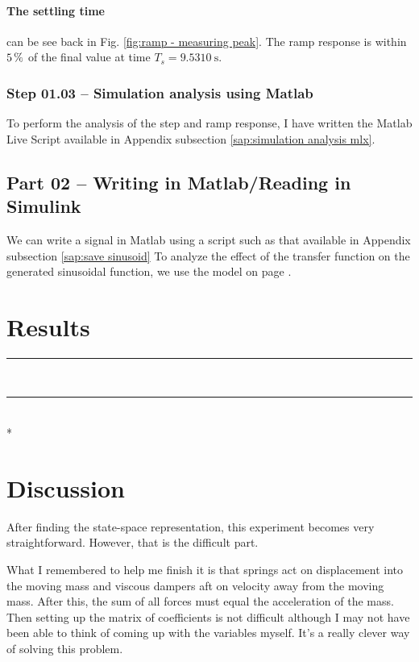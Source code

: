\documentclass[12pt]{article}
\def\hr{{\par\noindent\rule{\textwidth}{0.4pt}}}
\begin{document}
\paragraph{The settling time} can be see back in Fig. \ref{fig:ramp - measuring peak}.
The ramp response is within $\SI5\percent$ of the final value at time $T_s = \SI{9.5310}\second$.

\subsubsection{Step 01.03 -- Simulation analysis using Matlab}

To perform the analysis of the step and ramp response,
I have written the Matlab Live Script available in Appendix subsection \ref{sap:simulation analysis mlx}.

\subsection{Part 02 -- Writing in Matlab/Reading in Simulink}

We can write a signal in Matlab using a script such as that available in Appendix subsection \ref{sap:save sinusoid}
To analyze the effect of the transfer function on the generated sinusoidal function,
we use the model on page \pageref{pdf:part02}.



\section{Results}

\hr



\ \hr \\*



\section{Discussion}

After finding the state-space representation,
this experiment becomes very straightforward.
However, that is the difficult part.

What I remembered to help me finish it is that springs act on displacement into the moving mass and viscous dampers aft on velocity away from the moving mass.
After this, the sum of all forces must equal the acceleration of the mass.
Then setting up the matrix of coefficients is not difficult although I may not have been able to think of coming up with the variables myself.
It's a really clever way of solving this problem.
\end{document}
